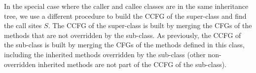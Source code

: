 
  

In the special case where the caller and callee classes are in the same inheritance tree, we use a different procedure to build the CCFG of the super-class and find the call sites $S$. The CCFG of the super-class is built by merging the CFGs of the methods that are not overridden by the sub-class. As previously, the CCFG of the sub-class is built by merging the CFGs of the methods defined in this class, including the inherited methods overridden by the sub-class (other non-overridden inherited methods are not part of the CCFG of the sub-class).



